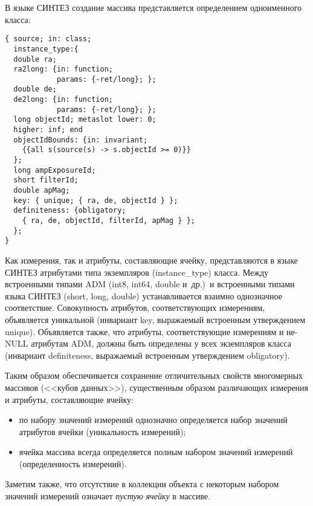 \begin{multicols}{2}
        В языке СИНТЕЗ создание массива представляется определением 
одноименного класса:
        \begin{verbatim}
{ source; in: class;
  instance_type:{
  double ra;
  ra2long: {in: function; 
            params: {-ret/long}; };
  double de;
  de2long: {in: function; 
            params: {-ret/long}; };
  long objectId; metaslot lower: 0;  
  higher: inf; end
  objectIdBounds: {in: invariant;
    {{all s(source(s) -> s.objectId >= 0)}}
  };
  long ampExposureId;
  short filterId;
  double apMag;
  key: { unique; { ra, de, objectId } };
  definiteness: {obligatory;
    { ra, de, objectId, filterId, apMag } };
  };
}
\end{verbatim}

        Как измерения, так и атрибуты, составляющие ячейку, представляются в 
языке СИНТЕЗ атрибутами типа экземпляров ({\sf instance\_type}) класса. Между 
встроенными типами ADM ({\sf int8}, {\sf int64}, {\sf double} и~др.)\ и встроенными 
типами языка \mbox{СИНТЕЗ} ({\sf short}, {\sf long}, {\sf double}) устанавливается взаимно 
однозначное соответствие. Совокупность атрибутов, со\-от\-вет\-ст\-ву\-ющих 
измерениям, объявляется уникальной (инвариант {\sf key}, выражаемый 
встроенным утверждением {\sf unique}). Объявляется также, что атрибуты, 
соответствующие измерениям и не-{\sf NULL} атрибутам ADM, должны быть 
определены у всех экземпляров класса (инвариант {\sf definiteness}, выражаемый 
встроенным утверждением {\sf obligatory}).
        
        Таким образом обеспечивается сохранение отличи\-тель\-ных свойств 
многомерных массивов (<<кубов данных>>), существенным образом 
раз\-ли\-ча\-ющих измерения и атрибуты, со\-став\-ля\-ющие \mbox{ячейку}:
        \begin{itemize}
\item по набору значений измерений однозначно определяется набор 
значений атрибутов ячейки (уникальность измерений);
\item ячейка массива всегда определяется полным набором значений 
измерений (определенность измерений).
\end{itemize}

        Заметим также, что отсутствие в коллекции объекта с некоторым 
набором значений измерений означает \textit{пустую ячейку} в массиве.
        

\end{multicols}

